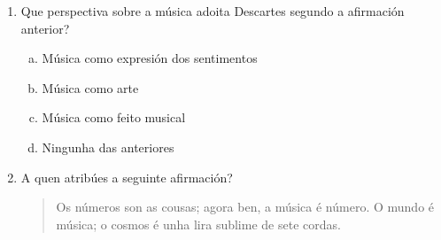 \begin{ejercicio}
\begin{enumerate}[1)]
 \item \label{perspectiva-descartes}
 Que perspectiva sobre a música adoita Descartes segundo a afirmación anterior?
 \begin{enumerate}[a)]
  \item 
  Música como expresión dos sentimentos
  \item
  Música como arte
  \item \label{sol:1}
  Música como feito musical
  \item
  Ningunha das anteriores
 \end{enumerate}
 \item \label{perpectiva-pitagoras}
 A quen atribúes a seguinte afirmación? \dotfill
     \begin{quote}
    {\small
    Os números son as cousas; agora ben, a música é número. O mundo é música; o cosmos é unha lira sublime de sete cordas.
    }
    \end{quote}
\end{enumerate}

\end{ejercicio}


